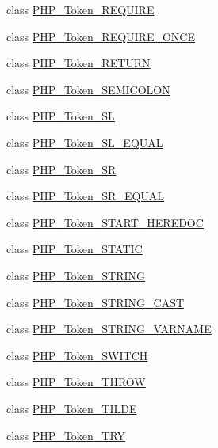 \begin{DoxyCompactItemize}
\item 
class \mbox{\hyperlink{class_p_h_p___token___r_e_q_u_i_r_e}{P\+H\+P\+\_\+\+Token\+\_\+\+R\+E\+Q\+U\+I\+RE}}
\item 
class \mbox{\hyperlink{class_p_h_p___token___r_e_q_u_i_r_e___o_n_c_e}{P\+H\+P\+\_\+\+Token\+\_\+\+R\+E\+Q\+U\+I\+R\+E\+\_\+\+O\+N\+CE}}
\item 
class \mbox{\hyperlink{class_p_h_p___token___r_e_t_u_r_n}{P\+H\+P\+\_\+\+Token\+\_\+\+R\+E\+T\+U\+RN}}
\item 
class \mbox{\hyperlink{class_p_h_p___token___s_e_m_i_c_o_l_o_n}{P\+H\+P\+\_\+\+Token\+\_\+\+S\+E\+M\+I\+C\+O\+L\+ON}}
\item 
class \mbox{\hyperlink{class_p_h_p___token___s_l}{P\+H\+P\+\_\+\+Token\+\_\+\+SL}}
\item 
class \mbox{\hyperlink{class_p_h_p___token___s_l___e_q_u_a_l}{P\+H\+P\+\_\+\+Token\+\_\+\+S\+L\+\_\+\+E\+Q\+U\+AL}}
\item 
class \mbox{\hyperlink{class_p_h_p___token___s_r}{P\+H\+P\+\_\+\+Token\+\_\+\+SR}}
\item 
class \mbox{\hyperlink{class_p_h_p___token___s_r___e_q_u_a_l}{P\+H\+P\+\_\+\+Token\+\_\+\+S\+R\+\_\+\+E\+Q\+U\+AL}}
\item 
class \mbox{\hyperlink{class_p_h_p___token___s_t_a_r_t___h_e_r_e_d_o_c}{P\+H\+P\+\_\+\+Token\+\_\+\+S\+T\+A\+R\+T\+\_\+\+H\+E\+R\+E\+D\+OC}}
\item 
class \mbox{\hyperlink{class_p_h_p___token___s_t_a_t_i_c}{P\+H\+P\+\_\+\+Token\+\_\+\+S\+T\+A\+T\+IC}}
\item 
class \mbox{\hyperlink{class_p_h_p___token___s_t_r_i_n_g}{P\+H\+P\+\_\+\+Token\+\_\+\+S\+T\+R\+I\+NG}}
\item 
class \mbox{\hyperlink{class_p_h_p___token___s_t_r_i_n_g___c_a_s_t}{P\+H\+P\+\_\+\+Token\+\_\+\+S\+T\+R\+I\+N\+G\+\_\+\+C\+A\+ST}}
\item 
class \mbox{\hyperlink{class_p_h_p___token___s_t_r_i_n_g___v_a_r_n_a_m_e}{P\+H\+P\+\_\+\+Token\+\_\+\+S\+T\+R\+I\+N\+G\+\_\+\+V\+A\+R\+N\+A\+ME}}
\item 
class \mbox{\hyperlink{class_p_h_p___token___s_w_i_t_c_h}{P\+H\+P\+\_\+\+Token\+\_\+\+S\+W\+I\+T\+CH}}
\item 
class \mbox{\hyperlink{class_p_h_p___token___t_h_r_o_w}{P\+H\+P\+\_\+\+Token\+\_\+\+T\+H\+R\+OW}}
\item 
class \mbox{\hyperlink{class_p_h_p___token___t_i_l_d_e}{P\+H\+P\+\_\+\+Token\+\_\+\+T\+I\+L\+DE}}
\item 
class \mbox{\hyperlink{class_p_h_p___token___t_r_y}{P\+H\+P\+\_\+\+Token\+\_\+\+T\+RY}}

\end{DoxyCompactItemize}
